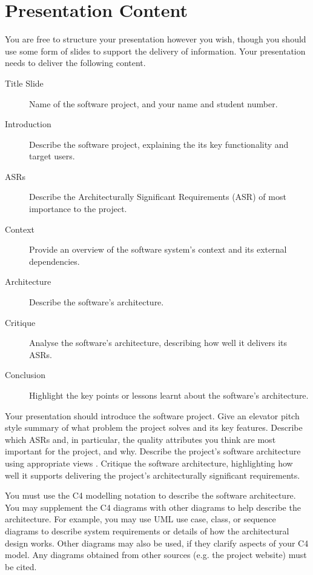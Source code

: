\documentclass{csse4400}
\begin{document}
\section{Presentation Content}
You are free to structure your presentation however you wish,
though you should use some form of slides to support the delivery of information.
Your presentation needs to deliver the following content.

\begin{description}
    \item[Title Slide] Name of the software project, and your name and student number.
    \item[Introduction] Describe the software project, explaining the its key functionality and target users.
    \item[ASRs] Describe the Architecturally Significant Requirements (ASR) of most importance to the project.
    \item[Context] Provide an overview of the software system's context and its external dependencies.
    \item[Architecture] Describe the software's architecture.
    \item[Critique] Analyse the software's architecture, describing how well it delivers its ASRs.
    \item[Conclusion] Highlight the key points or lessons learnt about the software's architecture.
\end{description}

Your presentation should introduce the software project.
Give an elevator pitch style summary of what problem the project solves and its key features.
Describe which ASRs and, in particular, the quality attributes you think are most important for the project, and why.
Describe the project's software architecture using appropriate views \cite{view-notes}.
Critique the software architecture, highlighting how well it supports delivering the project's architecturally significant requirements.

You must use the C4 modelling notation \cite{view-notes} \cite{brown2022c4} to describe the software architecture.
You may supplement the C4 diagrams with other diagrams to help describe the architecture.
For example, you may use UML use case, class, or sequence diagrams \cite{view-notes} \cite{uml}
to describe system requirements or details of how the architectural design works.
Other diagrams may also be used, if they clarify aspects of your C4 model.
Any diagrams obtained from other sources (e.g. the project website) must be cited.
\end{document}
